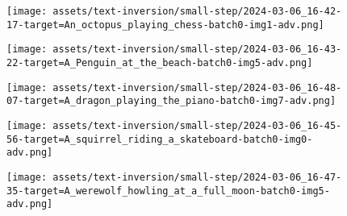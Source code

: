 \begin{figure*}[h]
\vspace{1ex}
\begin{minipage}[t]{.025\textwidth}
     \vspace{0pt}
\end{minipage}%
\hspace{1ex}
\begin{minipage}[t]{0.98\figwidth}
    \vspace{0pt}
    \begin{subfigure}[t]{0.2\textwidth}
        \texttt{[image: assets/text-inversion/small-step/2024-03-06\_16-42-17-target=An\_octopus\_playing\_chess-batch0-img1-adv.png]}
    \end{subfigure}%
    \begin{subfigure}[t]{0.2\textwidth}
        \texttt{[image: assets/text-inversion/small-step/2024-03-06\_16-43-22-target=A\_Penguin\_at\_the\_beach-batch0-img5-adv.png]}
    \end{subfigure}%
    \begin{subfigure}[t]{0.2\textwidth}
        \texttt{[image: assets/text-inversion/small-step/2024-03-06\_16-48-07-target=A\_dragon\_playing\_the\_piano-batch0-img7-adv.png]}
    \end{subfigure}%
    \begin{subfigure}[t]{0.2\textwidth}
        \texttt{[image: assets/text-inversion/small-step/2024-03-06\_16-45-56-target=A\_squirrel\_riding\_a\_skateboard-batch0-img0-adv.png]}
    \end{subfigure}%
    \begin{subfigure}[t]{0.2\textwidth}
        \texttt{[image: assets/text-inversion/small-step/2024-03-06\_16-47-35-target=A\_werewolf\_howling\_at\_a\_full\_moon-batch0-img5-adv.png]}
    \end{subfigure}%
\end{minipage}




\end{figure*}
